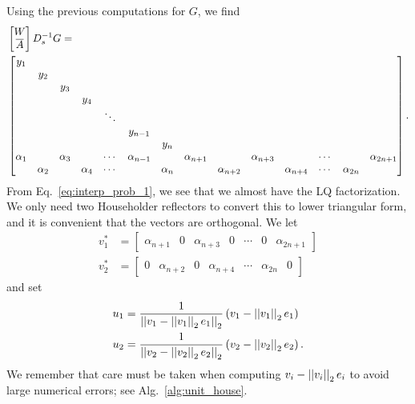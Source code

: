 Using the previous computations for $G$, we find
%
\begin{align}
    \setcounter{MaxMatrixCols}{20}
    &\begin{bmatrix} W \\ \overline{A} \end{bmatrix} D_{s}^{-1}G = \nonumber\\
    &\begin{bmatrix}
        y_{1} & & & & \\
        & y_{2} & & & \\
        & & y_{3} & & \\
        & & & y_{4} & \\
        & & & & \ddots \\
        & & & & & y_{n-1} & & \\
        & & & & & & y_{n} & \\
        \alpha_{1} & & \alpha_{3} & & \cdots & \alpha_{n-1} & &
            \alpha_{n+1} & & \alpha_{n+3} & & \cdots & & \alpha_{2n+1} \\
        & \alpha_{2} & & \alpha_{4} & \cdots & & \alpha_{n} & &
            \alpha_{n+2} & & \alpha_{n+4} & \cdots & \alpha_{2n} & \\
    \end{bmatrix}.
    \label{eq:interp_prob_1}
\end{align}
%
From Eq.~\eqref{eq:interp_prob_1}, we see that we almost have the LQ
factorization.
We only need two Householder reflectors to convert this to lower triangular
form, and it is convenient that the vectors are orthogonal.
We let
%
\begin{align}
    v_{1}^{*} &= \begin{bmatrix} \alpha_{n+1} & 0 & \alpha_{n+3} & 0 &
                \cdots & 0 & \alpha_{2n+1} \end{bmatrix} \nonumber\\
    v_{2}^{*} &= \begin{bmatrix} 0 & \alpha_{n+2} & 0 & \alpha_{n+4} &
                \cdots & \alpha_{2n} & 0 \end{bmatrix}
\end{align}
%
and set
%
\begin{align}
    u_{1} &= \frac{1}{\left| \left| v_{1} - \left| \left| v_{1} \right| \right|_{2}e_{1} \right| \right|_{2}}
        \left( v_{1} - \left| \left| v_{1} \right| \right|_{2}e_{1} \right) \nonumber\\
    u_{2} &= \frac{1}{\left| \left| v_{2} - \left| \left| v_{2} \right| \right|_{2}e_{2} \right| \right|_{2}}
        \left( v_{2} - \left| \left| v_{2} \right| \right|_{2}e_{2} \right).
\end{align}
%
We remember that care must be taken when computing
$v_{i} - \left| \left| v_{i} \right| \right|_{2}e_{i}$ to avoid large numerical errors;
see Alg.~\ref{alg:unit_house}.

